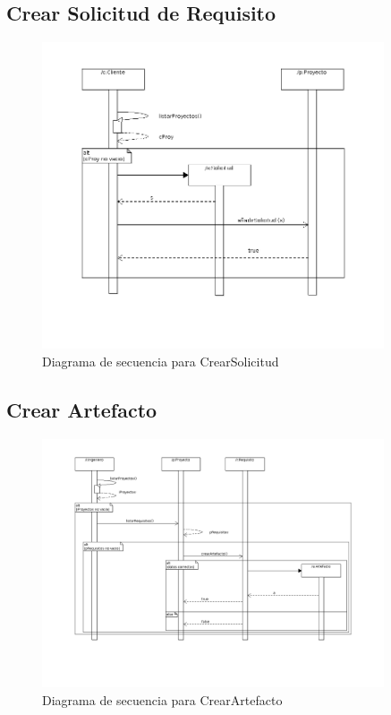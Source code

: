 \documentclass[a4paper, spanish]{article}
\begin{document}
\pagebreak\subsection{Crear Solicitud de Requisito} %
\begin{figure}[h!]
\centering
\includegraphics[width=0.9\textwidth]{diagramas/diagramasSecuencia/CrearSolicitud_sd.png}
\caption{Diagrama de secuencia para CrearSolicitud}
\end{figure}


\pagebreak\subsection{Crear Artefacto}
\begin{figure}[h!]
\centering
\includegraphics[width=0.9\textwidth]{diagramas/diagramasSecuencia/CrearArtefacto_sd.png}
\caption{Diagrama de secuencia para CrearArtefacto}
\end{figure}
\end{document}
